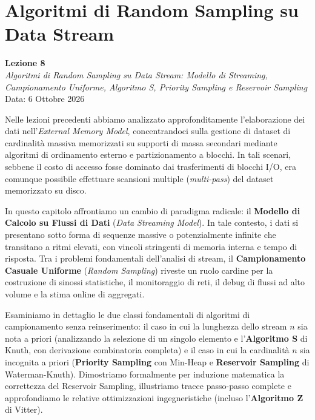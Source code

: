 \chapter{Algoritmi di Random Sampling su Data Stream}
\label{chap:random-sampling-data-streams}

\begin{center}
  \textbf{Lezione 8}\\
  \emph{Algoritmi di Random Sampling su Data Stream: Modello di Streaming, Campionamento Uniforme, Algoritmo S, Priority Sampling e Reservoir Sampling}\\[0.5em]
  Data: 6 Ottobre 2026
\end{center}

Nelle lezioni precedenti abbiamo analizzato approfonditamente l'elaborazione dei dati nell'\textit{External Memory Model}, concentrandoci sulla gestione di dataset di cardinalità massiva memorizzati su supporti di massa secondari mediante algoritmi di ordinamento esterno e partizionamento a blocchi. In tali scenari, sebbene il costo di accesso fosse dominato dai trasferimenti di blocchi I/O, era comunque possibile effettuare scansioni multiple (\textit{multi-pass}) del dataset memorizzato su disco.

In questo capitolo affrontiamo un cambio di paradigma radicale: il \textbf{Modello di Calcolo su Flussi di Dati} (\textit{Data Streaming Model}). In tale contesto, i dati si presentano sotto forma di sequenze massive o potenzialmente infinite che transitano a ritmi elevati, con vincoli stringenti di memoria interna e tempo di risposta. Tra i problemi fondamentali dell'analisi di stream, il \textbf{Campionamento Casuale Uniforme} (\textit{Random Sampling}) riveste un ruolo cardine per la costruzione di sinossi statistiche, il monitoraggio di reti, il debug di flussi ad alto volume e la stima online di aggregati.

Esaminiamo in dettaglio le due classi fondamentali di algoritmi di campionamento senza reinserimento: il caso in cui la lunghezza dello stream $n$ sia nota a priori (analizzando la selezione di un singolo elemento e l'\textbf{Algoritmo S} di Knuth, con derivazione combinatoria completa) e il caso in cui la cardinalità $n$ sia incognita a priori (\textbf{Priority Sampling} con Min-Heap e \textbf{Reservoir Sampling} di Waterman-Knuth). Dimostriamo formalmente per induzione matematica la correttezza del Reservoir Sampling, illustriamo tracce passo-passo complete e approfondiamo le relative ottimizzazioni ingegneristiche (incluso l'\textbf{Algoritmo Z} di Vitter).

